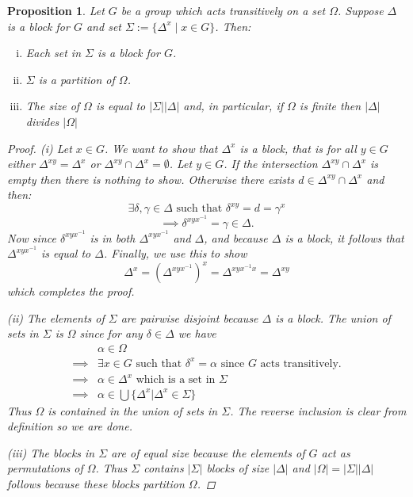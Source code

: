 \documentclass[]{article}
\newtheorem{prop}[thm]{Proposition}
\theoremstyle{definition}
\begin{document}
\begin{prop} \label{prop:blocks}
	Let $G$ be a group which acts transitively on a set $\Omega$. Suppose $\Delta$ is a block for $G$ and set $\Sigma := \{\Delta^x \; | \; x \in G\}$. Then:
	\begin{enumerate}[(i)]
		\item Each set in $\Sigma$ is a block for $G$.
	\vspace{-0.2cm}	\item $\Sigma$ is a partition of $\Omega$.
	\vspace{-0.2cm} \item The size of $\Omega$ is equal to $|\Sigma||\Delta|$ and, in particular, if $\Omega$ is finite then $|\Delta|$ divides $|\Omega|$
	\end{enumerate}
\begin{proof} (i) Let $x \in G$. We want to show that $\Delta^x$ is a block, that is for all $y \in G$ either $\Delta^{xy} = \Delta^x$ or $\Delta^{xy} \cap \Delta^x = \emptyset$. Let $y \in G$. If the intersection $\Delta^{xy} \cap \Delta^x$ is empty then there is nothing to show. Otherwise there exists $d \in \Delta^{xy} \cap \Delta^x$ and then:
    $$ \exists \delta, \gamma \in \Delta \mbox{ such that } \delta^{xy} = d = \gamma^x$$
    $$ \implies \delta^{xyx^{-1}} = \gamma \in \Delta.$$
    Now since $\delta^{xyx^{-1}}$ is in both $\Delta^{xyx^{-1}}$ and $\Delta$, and because $\Delta$ is a block, it follows that $\Delta^{xyx^{-1}}$ is equal to $\Delta$. Finally, we use this to show
$$\Delta^x = (\Delta^{xyx^{-1}})^x = \Delta^{xyx^{-1}x} = \Delta^{xy}$$
which completes the proof.

(ii) The elements of $\Sigma$ are pairwise disjoint because $\Delta$ is a block. The union of sets in $\Sigma$ is $\Omega$ since for any $\delta \in \Delta$ we have
\begin{align*}
& \alpha \in \Omega \\
\implies & \exists x \in G \mbox{ such that } \delta^x = \alpha \mbox{ since $G$ acts transitively.} \\
\implies & \alpha \in \Delta^x \mbox{ which is a set in } \Sigma \\
\implies & \alpha \in \bigcup \{\Delta^x | \Delta^x \in \Sigma \}
\end{align*}
Thus $\Omega$ is contained in the union of sets in $\Sigma$. The reverse inclusion is clear from definition so we are done.

(iii) The blocks in $\Sigma$ are of equal size because the elements of $G$ act as permutations of $\Omega$. Thus $\Sigma$ contains $|\Sigma|$ blocks of size $|\Delta|$ and $|\Omega| = |\Sigma||\Delta|$ follows because these blocks partition $\Omega$.
\end{proof}
\end{prop}
\end{document}
